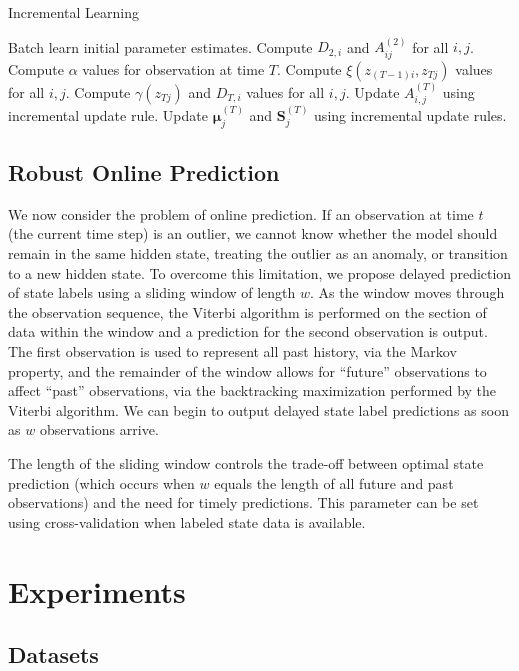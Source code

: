 \documentclass{article}
\begin{document}
\begin{algorithm}
\caption{Incremental Learning}
\small
\begin{algorithmic}[1]
\State Batch learn initial parameter estimates.
\State Compute $D_{2,i}$ and $A_{ij}^{(2)}$ for all $i,j$.
\State Compute $\alpha$ values for observation at time $T$.
\State Compute $\xi(z_{(T-1)i},z_{Tj})$ values for all $i,j$.
\State Compute $\gamma(z_{Tj})$ and $D_{T,i}$ values for all $i,j$.
\State Update $A_{i,j}^{(T)}$ using incremental update rule.
\State Update $\mathbf{\mu}_{j}^{(T)}$ and $\mathbf{S}_{j}^{(T)}$ using incremental update rules.
\EndFor
\end{algorithmic}
\label{alg:incremental}
\end{algorithm}

\subsection{Robust Online Prediction}

We now consider the problem of online prediction. If an observation at time $t$ (the current time step) is an outlier, we cannot know whether the model should remain in the same hidden state, treating the outlier as an anomaly, or transition to a new hidden state. To overcome this limitation, we propose delayed prediction of state labels using a sliding window of length $w$. As the window moves through the observation sequence, the Viterbi algorithm is performed on the section of data within the window and a prediction for the second observation is output. The first observation is used to represent all past history, via the Markov property, and the remainder of the window allows for ``future'' observations to affect ``past'' observations, via the backtracking maximization performed by the Viterbi algorithm. We can begin to output delayed state label predictions as soon as $w$ observations arrive.

The length of the sliding window controls the trade-off between optimal state prediction (which occurs when $w$ equals the length of all future and past observations) and the need for timely predictions. This parameter can be set using cross-validation when labeled state data is available.

\section{Experiments}\label{sec:Experiments}


\subsection{Datasets}\label{sec:datasets}
\end{document}
